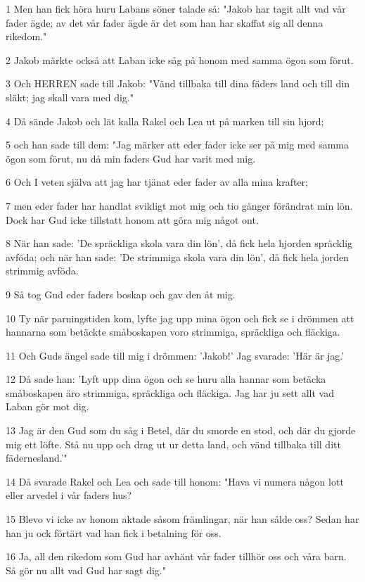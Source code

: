 \par 1 Men han fick höra huru Labans söner talade så: "Jakob har tagit allt vad vår fader ägde; av det vår fader ägde är det som han har skaffat sig all denna rikedom."
\par 2 Jakob märkte också att Laban icke såg på honom med samma ögon som förut.
\par 3 Och HERREN sade till Jakob: "Vänd tillbaka till dina fäders land och till din släkt; jag skall vara med dig."
\par 4 Då sände Jakob och lät kalla Rakel och Lea ut på marken till sin hjord;
\par 5 och han sade till dem: "Jag märker att eder fader icke ser på mig med samma ögon som förut, nu då min faders Gud har varit med mig.
\par 6 Och I veten själva att jag har tjänat eder fader av alla mina krafter;
\par 7 men eder fader har handlat svikligt mot mig och tio gånger förändrat min lön. Dock har Gud icke tillstatt honom att göra mig något ont.
\par 8 När han sade: 'De spräckliga skola vara din lön', då fick hela hjorden spräcklig avföda; och när han sade: 'De strimmiga skola vara din lön', då fick hela jorden strimmig avföda.
\par 9 Så tog Gud eder faders boskap och gav den åt mig.
\par 10 Ty när parningstiden kom, lyfte jag upp mina ögon och fick se i drömmen att hannarna som betäckte småboskapen voro strimmiga, spräckliga och fläckiga.
\par 11 Och Guds ängel sade till mig i drömmen: 'Jakob!' Jag svarade: 'Här är jag.'
\par 12 Då sade han: 'Lyft upp dina ögon och se huru alla hannar som betäcka småboskapen äro strimmiga, spräckliga och fläckiga. Jag har ju sett allt vad Laban gör mot dig.
\par 13 Jag är den Gud som du såg i Betel, där du smorde en stod, och där du gjorde mig ett löfte. Stå nu upp och drag ut ur detta land, och vänd tillbaka till ditt fädernesland.'"
\par 14 Då svarade Rakel och Lea och sade till honom: "Hava vi numera någon lott eller arvedel i vår faders hus?
\par 15 Blevo vi icke av honom aktade såsom främlingar, när han sålde oss? Sedan har han ju ock förtärt vad han fick i betalning för oss.
\par 16 Ja, all den rikedom som Gud har avhänt vår fader tillhör oss och våra barn. Så gör nu allt vad Gud har sagt dig."
